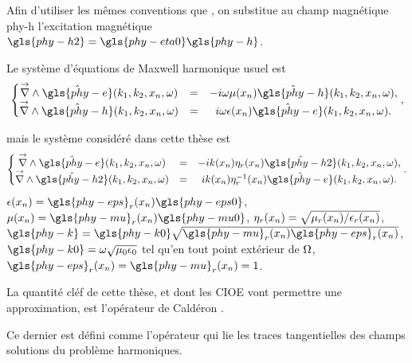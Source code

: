 Afin d'utiliser les mêmes conventions que \cite{stupfel_implementation_2015}, on substitue au champ magnétique \gls{phy-h} l’excitation magnétique \(\gls{phy-h2} = \gls{phy-eta0} \gls{phy-h}\).

Le système d'équations de Maxwell harmonique usuel est
\begin{equation}
    \left\lbrace
    \begin{matrix}
    \vrot \hat{\gls{phy-e}}(k_1,k_2,x_n,\w)  &=& -i \omega \mu(x_n) \hat{\gls{phy-h}}(k_1,k_2,x_n,\w),
    \\
    \vrot \hat{\gls{phy-h}}(k_1,k_2,x_n,\w)  &=& i \omega \eps(x_n) \hat{\gls{phy-e}}(k_1,k_2,x_n,\w).
    \end{matrix}
    \right.,
    \label{eq:imp_fourier:intro:maxwell_harmonique}
\end{equation}

mais le système considéré dans cette thèse est
\begin{equation}
    \left\lbrace
    \begin{matrix}
    \vrot \hat{\gls{phy-e}}(k_1,k_2,x_n,\w)  &=& -i k(x_n) \eta_r(x_n) \hat{\gls{phy-h2}}(k_1,k_2,x_n,\w),  \\
    \vrot \hat{\gls{phy-h2}}(k_1,k_2,x_n,\w)  &=& i k(x_n) \eta_r^{-1}(x_n) \hat{\gls{phy-e}}(k_1,k_2,x_n,\w).
    \end{matrix}
    \right..
    \label{eq:imp_fourier:intro:maxwell_harmonique:form_cea}
\end{equation}
\(\eps(x_n)=\gls{phy-eps}_r(x_n)\gls{phy-eps0}\), \(\mu(x_n)=\gls{phy-mu}_r(x_n)\gls{phy-mu0}\), \(\eta_r(x_n)=\sqrt{\mu_r(x_n)/\epsilon_r(x_n)}\), \(\gls{phy-k}=\gls{phy-k0}\sqrt{\gls{phy-mu}_r(x_n)\gls{phy-eps}_r(x_n)}\), \(\gls{phy-k0} = \w\sqrt{\mu_0\eps_0}\) tel qu'en tout point extérieur de \(\Omega\), \(\gls{phy-eps}_r(x_n) = \gls{phy-mu}_r(x_n)= 1\).

\hypertarget{calderon}{}
\begin{defn}{}
    \label{def:calderon}
    La quantité cléf de cette thèse, et dont les CIOE vont permettre une approximation, est l'opérateur de Caldéron \cite[Def~4, p.~108]{cessenat_mathematical_1996}.

    Ce dernier est défini comme l'opérateur qui lie les traces tangentielles des champs solutions du problème harmoniques.
\end{defn}


